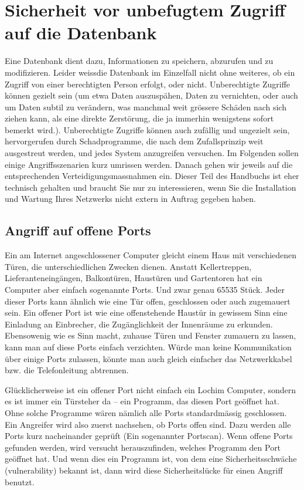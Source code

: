 \section{Sicherheit vor unbefugtem Zugriff auf die Datenbank}

Eine Datenbank dient dazu, Informationen zu speichern, abzurufen und zu modifizieren.
Leider \glqq weiss\grqq die Datenbank im Einzelfall nicht ohne weiteres, ob ein
Zugriff von einer berechtigten Person erfolgt, oder nicht. Unberechtigte Zugriffe können
gezielt sein (um etwa Daten auszuspähen, Daten zu vernichten, oder auch um Daten subtil
zu verändern, was manchmal weit grössere Schäden nach sich ziehen kann, als eine direkte Zerstörung, die ja immerhin
wenigstens sofort bemerkt wird.). Unberechtigte Zugriffe können auch zufällig und ungezielt sein, hervorgerufen durch Schadprogramme,
die nach dem Zufallsprinzip weit ausgestreut werden, und jedes System anzugreifen versuchen. Im Folgenden
sollen einige Angriffsszenarien kurz umrissen werden. Danach gehen wir jeweils auf die entsprechenden Verteidigungsmassnahmen ein.
Dieser Teil des Handbuchs ist eher technisch gehalten und braucht Sie nur zu interessieren, wenn Sie die Installation
und Wartung Ihres Netzwerks nicht extern in Auftrag gegeben haben.
\subsection{Angriff auf offene Ports}

Ein am Internet angeschlossener Computer gleicht einem Haus mit verschiedenen Türen, die unterschiedlichen Zwecken dienen.
Anstatt Kellertreppen, Lieferanteneingängen, Balkontüren, Haustüren und Gartentoren hat ein Computer aber einfach sogenannte Ports.
Und zwar genau 65535 Stück. Jeder dieser Ports kann ähnlich wie eine Tür offen, geschlossen oder auch zugemauert sein. Ein offener Port
ist wie eine offenstehende Haustür in gewissem Sinn eine Einladung an Einbrecher, die Zugänglichkeit der Innenräume zu erkunden. Ebensowenig
wie es Sinn macht, zuhause Türen und Fenster zumauern zu lassen, kann man auf
diese Ports einfach verzichten. Würde man keine Kommunikation über
einige Ports zulassen, könnte man auch gleich einfacher das Netzwerkkabel bzw. die Telefonleitung abtrennen.

Glücklicherweise ist ein offener Port nicht einfach ein \glqq Loch\grqq im Computer,
sondern es ist immer ein Türsteher da – ein Programm, das diesen Port geöffnet hat. Ohne solche Programme wären
nämlich alle Ports standardmässig geschlossen. Ein Angreifer wird also zuerst nachsehen, ob Ports offen sind.
Dazu werden alle Ports kurz nacheinander geprüft (Ein sogenannter Portscan). Wenn offene Ports gefunden werden,
wird versucht herauszufinden, welches Programm den Port geöffnet hat. Und wenn dies ein Programm ist, von dem eine Sicherheitsschwäche
(vulnerability) bekannt ist, dann wird diese Sicherheitslücke für einen Angriff benutzt.

